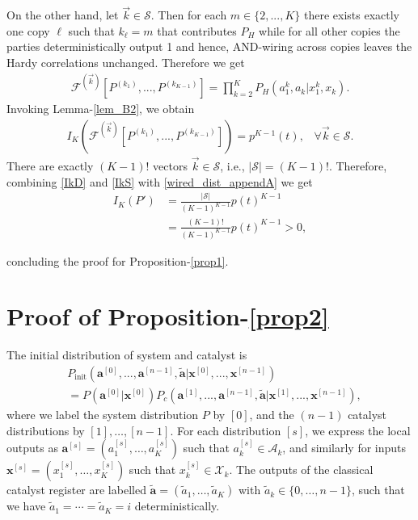 \documentclass[pra,aps,reprint,superscriptaddress]{revtex4-2}
\theoremstyle{theorem}
\begin{document}
On the other hand, let $\Vec{k}\in\mathcal{S}$. Then for each $m\in\{2,...,K\}$ there exists exactly one copy $\ell$ such that $k_\ell = m$ that contributes $P_H$ while for all other copies the parties deterministically output 1 and hence, AND-wiring across copies leaves the Hardy correlations unchanged. Therefore we get
 \begin{align}
     \mathcal{F}^{(\Vec{k})}\left[P^{(k_1)},...,P^{(k_{K-1})}\right] = \prod_{k=2}^K P_H(a_1^k,a_k|x_1^k,x_k).
 \end{align}
Invoking Lemma-\ref{lem_B2}, we obtain
\begin{align}\label{IkS}
    I_K\left(\mathcal{F}^{(\Vec{k})}\left[P^{(k_1)},...,P^{(k_{K-1})}\right]\right) = p^{K-1}(t),\;\;\;\forall \Vec{k}\in\mathcal{S}.
\end{align}
There are exactly $(K-1)!$ vectors  $\Vec{k}\in\mathcal{S}$, i.e., $|\mathcal{S}|=(K-1)!$. Therefore, combining \eqref{IkD} and \eqref{IkS} with \eqref{wired_dist_appendA} we get
\begin{align}\nonumber
    I_K(P')&=\frac{|\mathcal{S}|}{(K-1)^{K-1}}p(t)^{K-1}\\&=\frac{(K-1)!}{(K-1)^{K-1}}p(t)^{K-1}>0,\label{r1ap}
\end{align}

concluding the proof for Proposition-\ref{prop1}.



\section{Proof of Proposition-\ref{prop2}}
\label{app:catalyst}
The initial distribution of system and catalyst is 
\begin{align}
    &P_{\mathrm{init}}\left(\mathbf{a}^{[0]},...,\mathbf{a}^{[n-1]},\mathbf{\tilde a}\big| \mathbf{x}^{[0]},...,\mathbf{x}^{[n-1]}\right)\\& = P\left(\mathbf{a}^{[0]}\big|\mathbf{x}^{[0]}\right) P_c\left( \mathbf{a}^{[1]},...,\mathbf{a}^{[n-1]},\mathbf{\tilde a} \big| \mathbf{x}^{[1]},..., \mathbf{x}^{[n-1]}\right), 
\end{align}
where we label the system distribution $P$ by $[0]$, and the $(n-1)$ catalyst distributions by $[1],\ldots,[n-1]$. For each distribution $[s]$, we express the local outputs as $\mathbf{a}^{[s]}=(a_1^{[s]},\ldots,a_K^{[s]})$ such that $a_k^{[s]}\in \mathcal{A}_k$, and similarly for inputs $\mathbf{x}^{[s]}=(x_1^{[s]},\ldots,x_K^{[s]})$ such that $x_k^{[s]}\in \mathcal{X}_k$. The outputs of the classical catalyst register are labelled $\mathbf{\tilde a}=(\tilde a_1,\ldots,\tilde a_K)$ with $\tilde a_k\in\{0,\ldots,n-1\}$, such that we have $\tilde a_1=\cdots=\tilde a_K=i$ deterministically.
\end{document}
